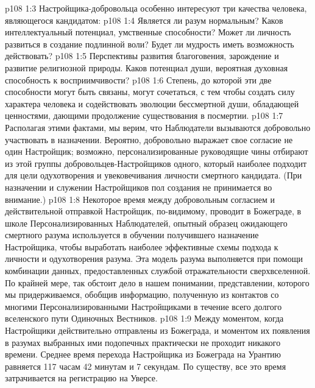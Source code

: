 \vs p108 1:3 Настройщика\hyp{}добровольца особенно интересуют три качества человека, являющегося кандидатом:
\vs p108 1:4 \bibnobreakspace {} Является ли разум нормальным? Каков интеллектуальный потенциал, умственные способности? Может ли личность развиться в создание подлинной воли? Будет ли мудрость иметь возможность действовать?
\vs p108 1:5 \bibnobreakspace {} Перспективы развития благоговения, зарождение и развитие религиозной природы. Каков потенциал души, вероятная духовная способность к восприимчивости?
\vs p108 1:6 \bibnobreakspace {} Степень, до которой эти две способности могут быть связаны, могут сочетаться, с тем чтобы создать силу характера человека и содействовать эволюции бессмертной души, обладающей ценностями, дающими продолжение существования в посмертии.
\vs p108 1:7 \pc Располагая этими фактами, мы верим, что Наблюдатели вызываются добровольно участвовать в назначении. Вероятно, добровольно выражает свое согласие не один Настройщик; возможно, персонализированные руководящие чины отбирают из этой группы добровольцев\hyp{}Настройщиков одного, который наиболее подходит для цели одухотворения и увековечивания личности смертного кандидата. (При назначении и служении Настройщиков пол создания не принимается во внимание.)
\vs p108 1:8 Некоторое время между добровольным согласием и действительной отправкой Настройщик, по\hyp{}видимому, проводит в Божеграде, в школе Персонализированных Наблюдателей, опытный образец ожидающего смертного разума используется в обучении получившего назначение Настройщика, чтобы выработать наиболее эффективные схемы подхода к личности и одухотворения разума. Эта модель разума выполняется при помощи комбинации данных, предоставленных службой отражательности сверхвселенной. По крайней мере, так обстоит дело в нашем понимании, представлении, которого мы придерживаемся, обобщив информацию, полученную из контактов со многими Персонализированными Настройщиками в течение всего долгого вселенского пути Одиночных Вестников.
\vs p108 1:9 Между моментом, когда Настройщики действительно отправлены из Божеграда, и моментом их появления в разумах выбранных ими подопечных практически не проходит никакого времени. Среднее время перехода Настройщика из Божеграда на Урантию равняется 117 часам 42 минутам и 7 секундам. По существу, все это время затрачивается на регистрацию на Уверсе.

